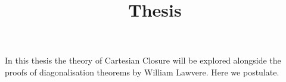 \documentclass[a4paper, 12pt]{article}
\date{}
\title{Thesis}
\begin{document}
\maketitle
In this thesis the theory of Cartesian Closure will be explored alongside the proofs of diagonalisation theorems by William Lawvere.
Here we postulate.

\begin{code}%
\>[0]\AgdaSpace{}%
\AgdaSpace{}%
\<%
\\
\>[0]\AgdaSpace{}%
\AgdaSpace{}%
\AgdaSymbol{\{}\AgdaSpace{}%
\AgdaSpace{}%
\AgdaSpace{}%
\AgdaSymbol{:}\AgdaSpace{}%
\AgdaSymbol{\}}\AgdaSpace{}%
\<%
\end{code}
\end{document}
